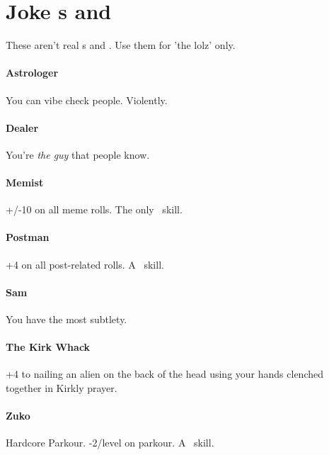 
\section{Joke \skillC s and \abilityPC}
\hypertarget{joke}{}
\par
These aren't real \skill s and \abilityPC . Use them for 'the lolz' only.

\paragraph{Astrologer}
\hypertarget{SkillAstrologer}{}
You can vibe check people. Violently.

\paragraph{Dealer}
\hypertarget{SkillDealer}{}
You're \textit{the guy} that people know.

\paragraph{Memist}
\hypertarget{SkillMemist}{}
+/-10 on all meme rolls. The only \both\, skill.

\paragraph{Postman}
\hypertarget{SkillPostman}{}
+4 on all post-related rolls. A \feelings\, skill.

\paragraph{Sam}
\hypertarget{SkillSam}{}
You have the most subtlety.

\paragraph{The Kirk Whack}
\hypertarget{SkillTheKirkWhack}{}
+4 to nailing an alien on the back of the head using your hands clenched together in Kirkly prayer.

\paragraph{Zuko}
\hypertarget{SkillZuko}{}
Hardcore Parkour. -2/level on parkour. A \lasers\, skill.